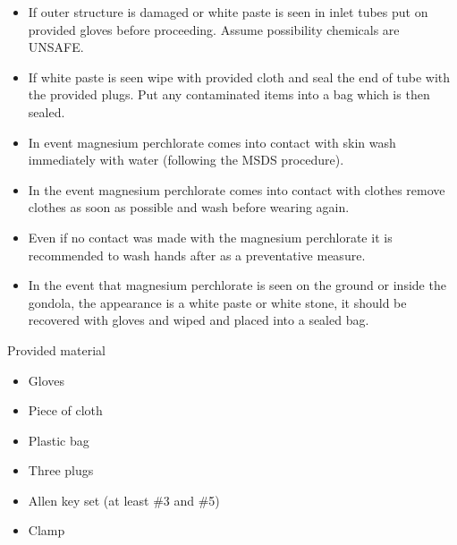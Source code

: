 \begin{itemize}
    \item If outer structure is damaged or white paste is seen in inlet tubes put on provided gloves before proceeding. Assume possibility chemicals are UNSAFE.
    \item If white paste is seen wipe with provided cloth and seal the end of tube with the provided plugs. Put any contaminated items into a bag which is then sealed.
    \item In event magnesium perchlorate comes into contact with skin wash immediately with water (following the MSDS procedure).
    \item In the event magnesium perchlorate comes into contact with clothes remove clothes as soon as possible and wash before wearing again.
    \item Even if no contact was made with the magnesium perchlorate it is recommended to wash hands after as a preventative measure.
    \item In the event that magnesium perchlorate is seen on the ground or inside the gondola, the appearance is a white paste or white stone, it should be recovered with gloves and wiped and placed into a sealed bag.
\end{itemize}

Provided material
\begin{itemize}
    \item Gloves
    \item Piece of cloth
    \item Plastic bag
    \item Three plugs
    \item Allen key set (at least \#3 and \#5)
    \item Clamp
\end{itemize}

\newpage

\newpage

